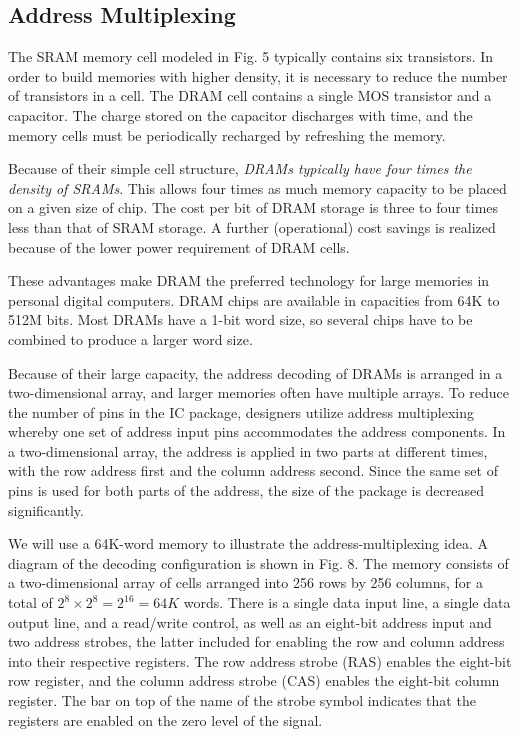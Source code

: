 \begin{multicols}{2}
\setlength{\columnsep}{1.5cm}
\setlength{\columnseprule}{0.2pt}

\subsection{Address Multiplexing}
\label{subsec:address-multiplexing}

The SRAM memory cell modeled in Fig. 5 typically contains six transistors. In order to build memories with higher density, it is necessary to reduce the number of transistors in a cell. The DRAM cell contains a single MOS transistor and a capacitor. The charge stored on the capacitor discharges with time, and the memory cells must be periodically recharged by refreshing the memory. 

Because of their simple cell structure, \textit{DRAMs typically have four times the density of SRAMs}. This allows four times as much memory capacity to be placed on a given size of chip. The cost per bit of DRAM storage is three to four times less than that of SRAM storage. A further (operational) cost savings is realized because of the lower power requirement of DRAM cells. 

These advantages make DRAM the preferred technology for large memories in personal digital computers. DRAM chips are available in capacities from 64K to 512M bits. Most DRAMs have a 1-bit word size, so several chips have to be combined to produce a larger word size.

\vspace*{\fill}
\columnbreak

Because of their large capacity, the address decoding of DRAMs is arranged in a two-dimensional array, and larger memories often have multiple arrays. To reduce the number of pins in the IC package, designers utilize address multiplexing whereby one set of address input pins accommodates the address components. In a two-dimensional array, the address is applied in two parts at different times, with the row address first and the column address second. Since the same set of pins is used for both parts of the address, the size of the package is decreased significantly.

We will use a 64K-word memory to illustrate the address-multiplexing idea. A diagram of the decoding configuration is shown in Fig. 8. The memory consists of a two-dimensional array of cells arranged into 256 rows by 256 columns, for a total of $2^8 \times 2^8 = 2^{16} = 64K$ words. There is a single data input line, a single data output line, and a read/write control, as well as an eight-bit address input and two address strobes, the latter included for enabling the row and column address into their respective registers. The row address strobe (RAS) enables the eight-bit row register, and the column address strobe (CAS) enables the eight-bit column register. The bar on top of the name of the strobe symbol indicates that the registers are enabled on the zero level of the signal.

\end{multicols}

